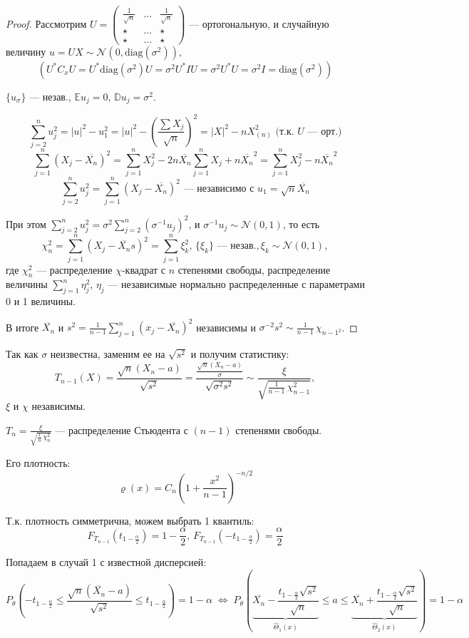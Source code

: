 \begin{enumerate}
\begin{proof}
		Рассмотрим $U = \left(\begin{matrix} \frac1{\sqrt{n}} & \dots & \frac1{\sqrt{n}} \\[-0 pt] \star & \dots & \star \\[-0 pt] \star & \dots & \star \end{matrix}\right)$ --- ортогональную, и случайную величину $u = UX \sim \mathcal{N}(0, \text{diag}(\sigma^2))$, 
		\[ \left( U^{*} C_x U = U^{*}\text{diag}(\sigma^2)U = \sigma^2 U^{*} I U = \sigma^2 U^{*} U = \sigma^2 I = \text{diag}(\sigma^2) \right) \]
		
		$\{ u_{\sigma} \}$ --- незав., $\mathbb{E} u_j = 0, \, \mathbb{D} u_j = \sigma^2$.
		
		\[ \sum_{j=2}^n u_j^2 = |u|^2 - u_1^2 = |u|^2 - \left( \frac{\sum X_j}{\sqrt{n}} \right)^2 = |X|^2 - nX^2_{(n)} \text{ (т.к. $U$ --- орт.)} \]
		\[ \sum_{j=1}^n (X_j - \overline{X_n})^2 = \sum_{j=1}^n X_j^2 - 2n \overline{X_n} \sum_{j=1}^n X_j + n\overline{X_n}^2 = \sum_{j=1}^n X_j^2 - n\overline{X_n}^2 \]
		\[ \sum_{j=2}^n u_j^2 = \sum_{j=1}^n (X_j - \overline{X_n})^2 \text{ --- независимо с } u_1 = \sqrt{n} \overline{X_n} \]
		
		При этом $\sum_{j=2}^n u_j^2 = \sigma^2 \sum_{j=2}^n (\sigma^{-1} u_j)^2$, и $\sigma^{-1} u_j \sim \mathcal{N}(0, 1)$, то есть
		\[ \chi_n^2 = \sum_{j=1}^n (X_j - \overline{X_n}s)^2 = \sum_{j=1}^n \xi_k^2, \, \{ \xi_k \} \text{ --- незав.}, \xi_k \sim \mathcal{N}(0, 1), \]
		где $\chi_n^2$ --- распределение $\chi$-квадрат с $n$ степенями свободы, распределение величины $\sum_{j=1}^n \eta_j^2$, $\eta_j$ --- независимые нормально распределенные с параметрами 0 и 1 величины.
		
		В итоге $\overline{X_n}$ и $s^2 = \frac1{n-1} \sum_{j=1}^n (x_j - \overline{X_n})^2$ независимы и $\sigma^{-2}s^2 \sim \frac1{n-1}\,\chi_{n-1^2}$.
	\end{proof}
	
	Так как $\sigma$ неизвестна, заменим ее на $\sqrt{s^2}$ и получим статистику:
	\[ T_{n-1}(X) = \frac{\sqrt{n}(X_n - a)}{\sqrt{s^2}} = \frac{\frac{\sqrt{n}(X_n - a)}{\sigma}}{\sqrt{\sigma^2 s^2}} \sim \frac{\xi}{\sqrt{\frac1{n-1}\,\chi^2_{n-1}}}, \]
	$\xi$ и $\chi$ независимы.
	
	$T_{n} = \frac{\xi}{\sqrt{\frac1n\,\chi_n^2}}$ --- распределение Стьюдента с $(n-1)$ степенями свободы.
	
	Его плотность:
	\[ \varrho(x) = C_n \left( 1 + \frac{x^2}{n-1} \right)^{-n/2} \]
 	
	Т.к. плотность симметрична, можем выбрать 1 квантиль:
	\[ F_{T_{n-1}}(t_{1 - \frac{\alpha}2}) = 1 - \frac{\alpha}2, \, F_{T_{n-1}}(-t_{1 - \frac{\alpha}2}) = \frac{\alpha}2 \]
	
	Попадаем в случай 1 с известной дисперсией:
	\[ P_{\theta} \left( -t_{1 - \frac{\alpha}2} \le \frac{\sqrt{n}(\overline{X_n} - a)}{\sqrt{s^2}} \le t_{1 - \frac{\alpha}2} \right) = 
	1 - \alpha \;\Leftrightarrow\; 
	P_{\theta} \left( \underset{\hat\Theta_1(x)}{\underbrace{\overline{X_n} - \frac{t_{1 - \frac{\alpha}2} \sqrt{s^2}}{\sqrt{n}}}} \le a \le 
	\underset{\hat\Theta_2(x)}{\underbrace{\overline{X_n} + \frac{t_{1 - \frac{\alpha}2} \sqrt{s^2}}{\sqrt{n}}}} \right) = 1 - \alpha \]
\end{enumerate}
